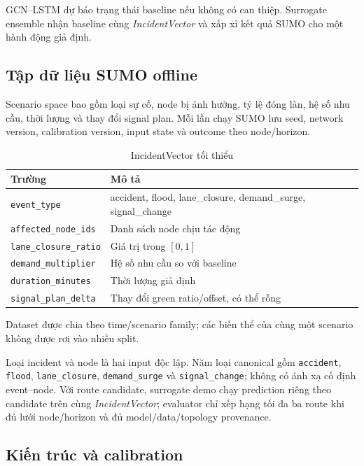 GCN--LSTM dự báo trạng thái baseline nếu không có can thiệp. Surrogate ensemble nhận baseline cùng \textit{IncidentVector} và xấp xỉ kết quả SUMO cho một hành động giả định.

\subsection{Tập dữ liệu SUMO offline}

Scenario space bao gồm loại sự cố, node bị ảnh hưởng, tỷ lệ đóng làn, hệ số nhu cầu, thời lượng và thay đổi signal plan. Mỗi lần chạy SUMO lưu seed, network version, calibration version, input state và outcome theo node/horizon.

\begin{table}[H]
\centering
\caption{IncidentVector tối thiểu}
\begin{tabular}{p{4cm} p{8cm}}
\toprule
\textbf{Trường} & \textbf{Mô tả} \\
\midrule
\texttt{event\_type} & accident, flood, lane\_closure, demand\_surge, signal\_change \\
\texttt{affected\_node\_ids} & Danh sách node chịu tác động \\
\texttt{lane\_closure\_ratio} & Giá trị trong $[0,1]$ \\
\texttt{demand\_multiplier} & Hệ số nhu cầu so với baseline \\
\texttt{duration\_minutes} & Thời lượng giả định \\
\texttt{signal\_plan\_delta} & Thay đổi green ratio/offset, có thể rỗng \\
\bottomrule
\end{tabular}
\end{table}

Dataset được chia theo time/scenario family; các biến thể của cùng một scenario không được rơi vào nhiều split.

Loại incident và node là hai input độc lập. Năm loại canonical gồm
\texttt{accident}, \texttt{flood}, \texttt{lane\_closure},
\texttt{demand\_surge} và \texttt{signal\_change}; không có ánh xạ cố định
event--node. Với route candidate, surrogate demo chạy prediction riêng theo
candidate trên cùng \textit{IncidentVector}; evaluator chỉ xếp hạng tối đa ba
route khi đủ lưới node/horizon và đủ model/data/topology provenance.

\subsection{Kiến trúc và calibration}

